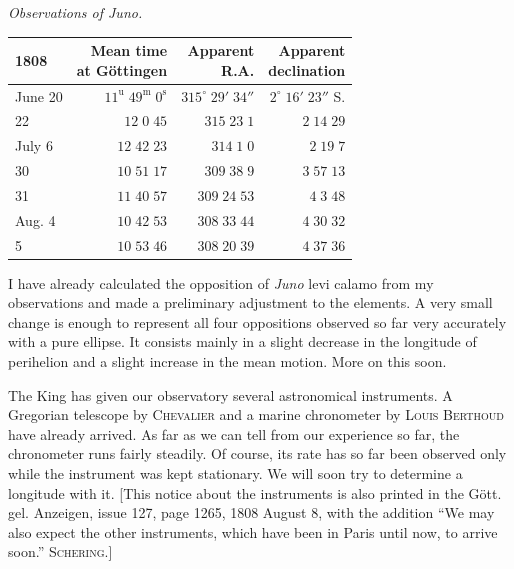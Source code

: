 \begin{center}
\emph{Observations of Juno.}
\end{center}


\begin{center}\fontsize{10}{12}\selectfont\setlength{\tabcolsep}{3pt}\renewcommand{\arraystretch}{1.15}\begin{tabular}{lrrr}
1808 & \shortstack{Mean time\\at Göttingen} & \shortstack{Apparent\\R.A.} & \shortstack{Apparent\\declination}\\\hline
June 20 & $11^{\text{u}}\;49^{\text{m}}\;0^{\text{s}}$ & $315^\circ\;29'\;34''$ & $2^\circ\;16'\;23''$ S.\\
22 & $12\;0\;45$ & $315\;23\;1$ & $2\;14\;29$\\
July 6 & $12\;42\;23$ & $314\;1\;0$ & $2\;19\;7$\\
30 & $10\;51\;17$ & $309\;38\;9$ & $3\;57\;13$\\
31 & $11\;40\;57$ & $309\;24\;53$ & $4\;3\;48$\\
Aug. 4 & $10\;42\;53$ & $308\;33\;44$ & $4\;30\;32$\\
5 & $10\;53\;46$ & $308\;20\;39$ & $4\;37\;36$\\
\end{tabular}\end{center}


\par{}

\par\indent I have already calculated the opposition of \emph{Juno} levi calamo from my observations and made a preliminary adjustment to the elements. A very small change is enough to represent all four oppositions observed so far very accurately with a pure ellipse. It consists mainly in a slight decrease in the longitude of perihelion and a slight increase in the mean motion. More on this soon.

\par\indent The King has given our observatory several astronomical instruments. A Gregorian telescope by \textsc{Chevalier} and a marine chronometer by \textsc{Louis Berthoud} have already arrived. As far as we can tell from our experience so far, the chronometer runs fairly steadily. Of course, its rate has so far been observed only while the instrument was kept stationary. We will soon try to determine a longitude with it. [This notice about the instruments is also printed in the Gött. gel. Anzeigen, issue 127, page 1265, 1808 August 8, with the addition “We may also expect the other instruments, which have been in Paris until now, to arrive soon.” \textsc{Schering}.]

